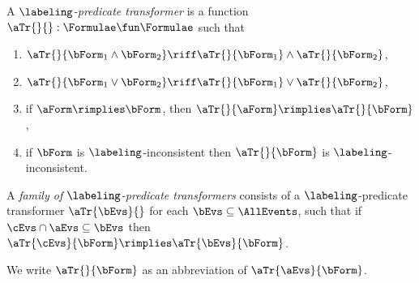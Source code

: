 \begin{definition}
  \label{def:trans}
  A \emph{$\labeling$-predicate transformer} is a %
  function
  $\aTr{}{}:\Formulae\fun\Formulae$ such that
  \begin{multicols}{2}
    \begin{enumerate}[,label=(\textsc{x}\arabic*),ref=\textsc{x}\arabic*]
    \item \label{tr-and}
      $\aTr{}{\bForm_1\land\bForm_2}\riff\aTr{}{\bForm_1}\land\aTr{}{\bForm_2}$,    
    \item \label{tr-or}
      $\aTr{}{\bForm_1\lor\bForm_2}\riff\aTr{}{\bForm_1}\lor\aTr{}{\bForm_2}$,
    \item \label{tr-implies}
      if $\aForm \rimplies \bForm$, then $\aTr{}{\aForm} \rimplies
      \aTr{}{\bForm}$,
    \item \label{tr-false}
      if $\bForm$ is $\labeling$-inconsistent then $\aTr{}{\bForm}$ is $\labeling$-inconsistent.
    \end{enumerate}
  \end{multicols}
\end{definition}

\begin{definition}
  \label{def:family}
  A \emph{family of $\labeling$-predicate transformers} consists
  of a $\labeling$-predicate transformer $\aTr{\bEvs}{}$ for each
  $\bEvs\subseteq\AllEvents$, such that if $\cEvs \cap \aEvs \subseteq \bEvs$
  then $\aTr{\cEvs}{\bForm} \rimplies \aTr{\bEvs}{\bForm}$.

  We write $\aTr{}{\bForm}$ as an abbreviation of $\aTr{\aEvs}{\bForm}$.
\end{definition}

